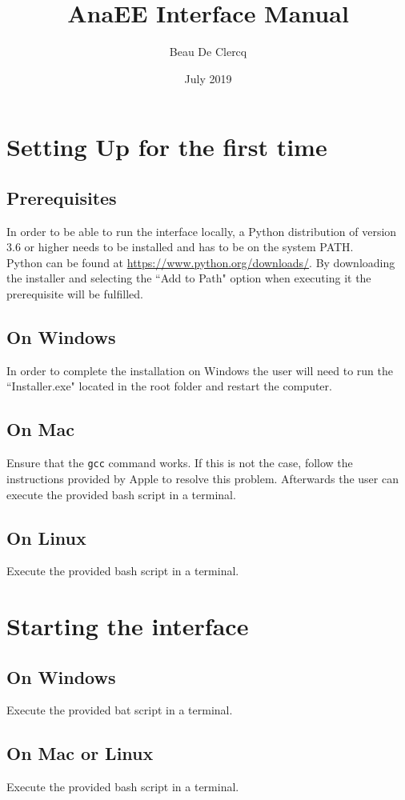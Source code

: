 \documentclass[12pt]{article}
\title{AnaEE Interface Manual}
\author{Beau De Clercq}
\date{July 2019}
\begin{document}
\maketitle{}

\tableofcontents

\clearpage
\newpage

\section{Setting Up for the first time}
\subsection{Prerequisites}
In order to be able to run the interface locally, a Python distribution of version 3.6 or higher needs to be installed and has to be on the system PATH.\\
Python can be found at \url{https://www.python.org/downloads/}. By downloading the installer and selecting the ``Add to Path" option when executing it the prerequisite will be fulfilled.
\subsection{On Windows}
In order to complete the installation on Windows the user will need to run the ``Installer.exe" located in the root folder and restart the computer.
\subsection{On Mac}
Ensure that the \texttt{gcc} command works. If this is not the case, follow the instructions provided by Apple to resolve this problem. Afterwards the user can execute the provided bash script in a terminal.
\subsection{On Linux}
Execute the provided bash script in a terminal.
\newpage
\section{Starting the interface}
\subsection{On Windows}
Execute the provided bat script in a terminal.
\subsection{On Mac or Linux}
Execute the provided bash script in a terminal.
\newpage
\end{document}

